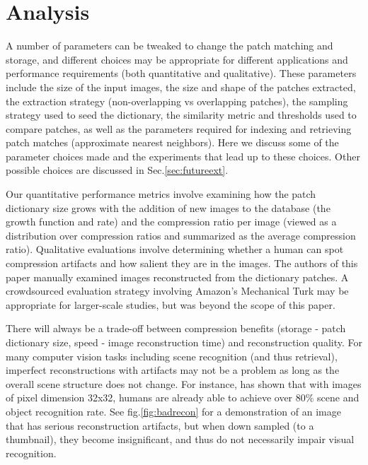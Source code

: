 \section{Analysis}\label{sec:analysis}

A number of parameters can be tweaked to change the patch matching and storage, and different choices may be appropriate for different applications and performance requirements (both quantitative and qualitative). These parameters include the size of the input images, the size and shape of the patches extracted, the extraction strategy (non-overlapping vs overlapping patches), the sampling strategy used to seed the dictionary, the similarity metric and thresholds used to compare patches, as well as the parameters required for indexing and retrieving patch matches (approximate nearest neighbors). Here we discuss some of the parameter choices made and the experiments that lead up to these choices. Other possible choices are discussed in Sec.\ref{sec:futureext}.

Our quantitative performance metrics involve examining how the patch dictionary size grows with the addition of new images to the database (the growth function and rate) and the compression ratio per image (viewed as a distribution over compression ratios and summarized as the average compression ratio). Qualitative evaluations involve determining whether a human can spot compression artifacts and how salient they are in the images. The authors of this paper manually examined images reconstructed from the dictionary patches. A crowdsourced evaluation strategy involving Amazon's Mechanical Turk may be appropriate for larger-scale studies, but was beyond the scope of this paper.

There will always be a trade-off between compression benefits (storage - patch dictionary size, speed - image reconstruction time) and reconstruction quality. For many computer vision tasks including scene recognition (and thus retrieval), imperfect reconstructions with artifacts may not be a problem as long as the overall scene structure does not change. For instance, \cite{tiny_images} has shown that with images of pixel dimension 32x32, humans are already able to achieve over $80\%$ scene and object recognition rate. See fig.\ref{fig:badrecon} for a demonstration of an image that has serious reconstruction artifacts, but when down sampled (to a thumbnail), they become insignificant, and thus do not necessarily impair visual recognition.

